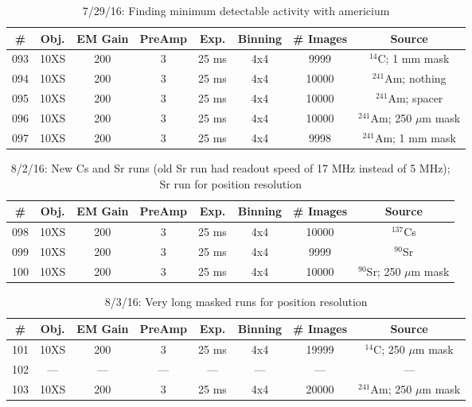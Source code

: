 \documentclass[12pt]{amsart}
\begin{document}
\begin{table}[!htbp]
	\centering
	\caption{7/29/16: Finding minimum detectable activity with americium}
	\label{tab:table16}
	\hspace*{-1cm}
	\begin{tabular}{cccccccc}
	\toprule
	\# & Obj. & EM Gain & PreAmp & Exp. & Binning & \# Images & Source\\
	\midrule
	093 & 10XS & 200 & 3 & 25 ms & 4x4 & 9999 & $^{14}$C; 1 mm mask\\
	094 & 10XS & 200 & 3 & 25 ms & 4x4 & 10000 & $^{241}$Am; nothing\\
	095 & 10XS & 200 & 3 & 25 ms & 4x4 & 10000 & $^{241}$Am; spacer\\
	096 & 10XS & 200 & 3 & 25 ms & 4x4 & 10000 & $^{241}$Am; 250 $\mu$m mask\\
	097 & 10XS & 200 & 3 & 25 ms & 4x4 & 9998 & $^{241}$Am; 1 mm mask\\
	\bottomrule
	\end{tabular}
	\hspace*{-1cm}
\end{table}

\begin{table}[!htbp]
	\centering
	\caption{8/2/16: New Cs and Sr runs (old Sr run had readout speed of 17 MHz instead of 5 MHz); Sr run for position resolution}
	\label{tab:table17}
	\hspace*{-1cm}
	\begin{tabular}{cccccccc}
	\toprule
	\# & Obj. & EM Gain & PreAmp & Exp. & Binning & \# Images & Source\\
	\midrule
	098 & 10XS & 200 & 3 & 25 ms & 4x4 & 10000 & $^{137}$Cs\\
	099 & 10XS & 200 & 3 & 25 ms & 4x4 & 9999 & $^{90}$Sr\\
	100 & 10XS & 200 & 3 & 25 ms & 4x4 & 10000 & $^{90}$Sr; 250 $\mu$m mask\\
	\bottomrule
	\end{tabular}
	\hspace*{-1cm}
\end{table}

\begin{table}[!htbp]
	\centering
	\caption{8/3/16: Very long masked runs for position resolution}
	\label{tab:table18}
	\hspace*{-1cm}
	\begin{tabular}{cccccccc}
	\toprule
	\# & Obj. & EM Gain & PreAmp & Exp. & Binning & \# Images & Source\\
	\midrule
	101 & 10XS & 200 & 3 & 25 ms & 4x4 & 19999 & $^{14}$C; 250 $\mu$m mask\\
	102 & --- & --- & --- & --- & --- & --- & ---\\
	103 & 10XS & 200 & 3 & 25 ms & 4x4 & 20000 & $^{241}$Am; 250 $\mu$m mask\\
	\bottomrule
	\end{tabular}
	\hspace*{-1cm}
\end{table}
\end{document}
